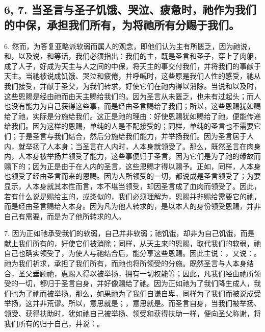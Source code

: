 
\subsection{6, 7. 当圣言与圣子饥饿、哭泣、疲惫时，祂作为我们的中保，承担我们所有，为将祂所有分赐于我们。}

6. 然而，为答复亚略派软弱而属人的观念，即他们认为主有所匮乏，因为祂说，和，以及说，和等话，我们必须指出：我们的主，既是圣言和圣子，穿上了肉躯，成了人子，好成为天主与人之间的中保，将天主的事交付我们，并将我们的事献于天主。当祂被说成饥饿、哭泣和疲倦，并呼喊时，这些原是我们人性的感受，祂从我们接受，并献于圣父，为我们转求，好使它们在祂内得以消除。当说和以及时，这些恩赐是经由祂而由天主赐给我们的。因为圣言从未匮乏，也未有过起头；而人也没有能力为自己获得这些事，而是经由圣言赐给了我们；所以，这些恩赐犹如赐给了祂，实际是分施给我们。这正是祂的理由：好使恩赐犹如赐给了祂，便能传递给我们。因为这样的恩赐，单纯的人是不配接受的；同样，单纯的圣言也不需要它们；于是圣言与我们结合，然后分施给我们能力，并举扬我们。因为圣言居于人内，就举扬了人本身；当圣言在人内时，人本身就领受了。那么，既然圣言在肉身内，人本身被举扬并领受了能力，这些事便归于圣言，因为它们是为了祂的缘故而赐下的；因为正是由于在人内的圣言，这些恩赐才得以赐予。正如，同样，人本身也领受了经由圣言而来的恩赐。因为人所领受的一切，都说成是圣言领受了；为要显示，人本身就其本性而言，本不堪当领受，却因圣言成了血肉而领受了。因此，若有什么说是赐给主的，或类似的，我们必须理解为，恩赐并非赐给需要它的祂，而是经由圣言赐给人本身。因为凡为他人转求的，是以本人的身份领受恩赐，并非自己有需要，而是为了他所转求的人。\par

7. 因为正如祂承受我们的软弱，自己并非软弱；祂饥饿，却非为自己饥饿，而是献上我们所有的，好使它们被消除；同样，从天主来的恩赐，取代我们的软弱，祂自己也确实领受了，为使人与祂结合后，能分享这些恩赐。因此主说：，又说：。祂为我们祈求，承担了我们所有，而祂也将所领受的分施。既然圣言与人本身结合，圣父垂顾祂，惠赐人得以被举扬，拥有一切权能等；因此，凡我们经由祂所领受的一切，都归于圣言自身，并好像赐给了祂。因为正如祂为了我们降生成人，我们也为了祂而被举扬。那么，如果祂为了我们自谦自卑，同样为了我们而被说成受举扬，这并非荒谬。所以，意思就是；，意思就是。而圣言自身，当我们被举扬、领受、获得扶助时，犹如祂自己被举扬、领受和获得扶助一样，便向圣父称谢，将我们所有的归于自己，并说：。\par

